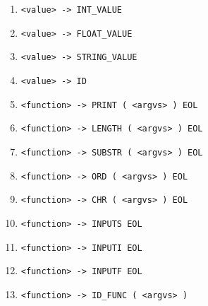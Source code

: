 \documentclass [11pt, a4paper]{article}
\begin{document}
\begin{table}[H]
\begin{enumerate}[noitemsep]
        \item \verb|<value> -> INT_VALUE|
        \item \verb|<value> -> FLOAT_VALUE|
        \item \verb|<value> -> STRING_VALUE|
        \item \verb|<value> -> ID|
       
        \item \verb|<function> -> PRINT ( <argvs> ) EOL|
        \item \verb|<function> -> LENGTH ( <argvs> ) EOL|
        \item \verb|<function> -> SUBSTR ( <argvs> ) EOL|
        \item \verb|<function> -> ORD ( <argvs> ) EOL|
        \item \verb|<function> -> CHR ( <argvs> ) EOL|
        \item \verb|<function> -> INPUTS EOL|
        \item \verb|<function> -> INPUTI EOL|
        \item \verb|<function> -> INPUTF EOL|
        \item \verb|<function> -> ID_FUNC ( <argvs> )|
	\end{enumerate}

	\label{table:ll_gramatika}
\end{table}
\end{document}
